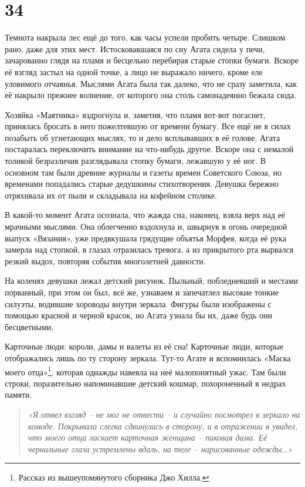 \documentclass[
  a5paperpaper,
  DIV=11,
  numbers=noendperiod]{scrreprt}
\begin{document}
\section*{34}\label{34}


Темнота накрыла лес ещё до того, как часы успели пробить четыре. Слишком
рано, даже для этих мест. Истосковавшаяся по сну Агата сидела у печи,
зачарованно глядя на пламя и бесцельно перебирая старые стопки бумаги.
Вскоре её взгляд застыл на одной точке, а лицо не выражало ничего, кроме
еле уловимого отчаянья. Мыслями Агата была так далеко, что не сразу
заметила, как её накрыло прежнее волнение, от которого она столь
самонадеянно бежала сюда.

Хозяйка «Маятника» вздрогнула и, заметив, что пламя вот-вот погаснет,
принялась бросать в него пожелтевшую от времени бумагу. Все ещё не в
силах позабыть об угнетающих мыслях, то и дело всплывавших в её голове,
Агата постаралась переключить внимание на что-нибудь другое. Вскоре она
с немалой толикой безразличия разглядывала стопку бумаги, лежавшую у её
ног. В основном там были древние журналы и газеты времен Советского
Союза, но временами попадались старые дедушкины стихотворения. Девушка
бережно отряхивала их от пыли и складывала на кофейном столике.

В какой-то момент Агата осознала, что жажда сна, наконец, взяла верх над
её мрачными мыслями. Она облегченно вздохнула и, швырнув в огонь
очередной выпуск «Вязания», уже предвкушала грядущие объятья Морфея,
когда её рука замерла над стопкой, в глазах отразилась тревога, а из
прикрытого рта вырвался резкий выдох, повторяя события многолетней
давности.

На коленях девушки лежал детский рисунок. Пыльный, побледневший и
местами порванный, при этом он был, всё же, узнаваем и запечатлел
высокие тонкие силуэты, водившие хороводы внутри зеркала. Фигуры были
изображены с помощью красной и черной красок, но Агата узнала бы их,
даже будь они бесцветными.

Карточные люди: короли, дамы и валеты из её сна! Карточные люди, которые
отображались лишь по ту сторону зеркала. Тут-то Агате и вспомнилась
«Маска моего отца»\footnote{Рассказ из вышеупомянутого сборника Джо
  Хилла.}, которая однажды навеяла на неё малопонятный ужас. Там были
строки, поразительно напоминавшие детский кошмар, похороненный в недрах
памяти.

\begin{quote}
\emph{«Я отвел взгляд -- не мог не отвести -- и случайно посмотрел в
зеркало на комоде. Покрывала слегка сдвинулись в сторону, и в отражении
я увидел, что моего отца ласкает карточная женщина -- пиковая дама. Её
чернильные глаза устремлены вдаль, на теле -- нарисованные
одежды\ldots»}
\end{quote}
\end{document}
